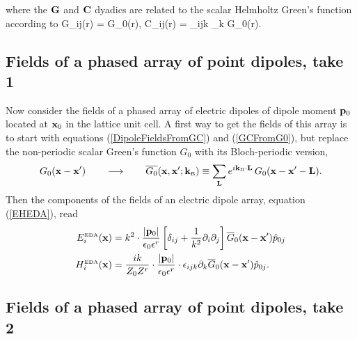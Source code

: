 \documentclass[letterpaper]{article}
\begin{document}
where the $\mathbf{G}$ and $\mathbf{C}$ dyadics are related to the
scalar Helmholtz Green's function according to
{
  G_{ij}(\vb r)
   =  G_0(\vb r),
\qquad
   C_{ij}(\vb r)
   = \varepsilon_{ijk} \partial_k G_0(\vb r).
}

\subsection*{Fields of a phased array of point dipoles, take 1}

Now consider the fields of a phased array of electric dipoles
of dipole moment $\mathbf{p}_0$ located at $\mathbf{x}_0$ in the lattice 
unit cell.
A first way to get the fields of this array is 
to start with equations (\ref{DipoleFieldsFromGC}) and
(\ref{GCFromG0}), but replace the non-periodic scalar
Green's function $G_0$ with its Bloch-periodic version,
$$ G_0(\mathbf{x}-\mathbf{x}^\prime) \qquad \longrightarrow \qquad 
   \overline{G_0}(\mathbf{x}, \mathbf{x}^\prime; \mathbf{k}_{\hbox{\tiny{B}}}) \equiv
   \sum_{\mathbf{L}} e^{i \mathbf{k}_{\hbox{\tiny{B}}} \cdot \mathbf{L}} \, G_0(\mathbf{x}- \mathbf{x}^\prime-\mathbf{L}).
$$
Then the components of the fields of an electric dipole array, 
equation (\ref{EHEDA}), read
\begin{align*}
 E_i^{\hbox{\tiny{EDA}}}(\mathbf{x})
 &=k^2 \cdot \frac{|\mathbf{p}_0|}{\epsilon_0 \epsilon^r } 
    \left[ \delta_{ij} + \frac{1}{k^2}\partial_i \partial_j
    \right] \overline{G}_{0}(\mathbf{x}-\mathbf{x}^\prime)\hat{p}_{0j}
\\
 H_i^{\hbox{\tiny{EDA}}}(\mathbf{x})
 &=\frac{ik}{Z_0 Z^r}
    \cdot \frac{|\mathbf{p}_0|}{\epsilon_0 \epsilon^r } \cdot
    \epsilon_{ijk} \partial_k \overline{G}_{0}(\mathbf{x}-\mathbf{x}^\prime)
    \hat{p}_{0j}.
\end{align*}

\subsection*{Fields of a phased array of point dipoles, take 2}
\end{document}
